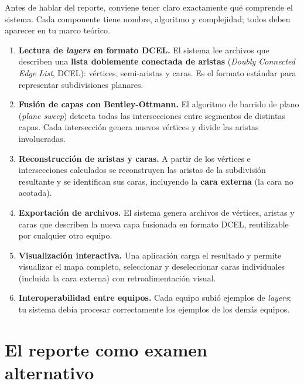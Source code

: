 \documentclass[12pt, oneside]{article}
\begin{document}
Antes de hablar del reporte, conviene tener claro exactamente qué
comprende el sistema.  Cada componente tiene nombre, algoritmo y
complejidad; todos deben aparecer en tu marco teórico.

\begin{enumerate}
  \item \textbf{Lectura de \textit{layers} en formato DCEL.}
        El sistema lee archivos que describen una \textbf{lista
        doblemente conectada de aristas} (\textit{Doubly Connected
        Edge List}, DCEL): vértices, semi-aristas y caras.  Es el
        formato estándar para representar subdivisiones planares.

  \item \textbf{Fusión de capas con Bentley-Ottmann.}
        El algoritmo de barrido de plano (\textit{plane sweep})
        detecta todas las intersecciones entre segmentos de distintas
        capas.  Cada intersección genera nuevos vértices y divide las
        aristas involucradas.

  \item \textbf{Reconstrucción de aristas y caras.}
        A partir de los vértices e intersecciones calculados se
        reconstruyen las aristas de la subdivisión resultante y se
        identifican sus caras, incluyendo la \textbf{cara externa}
        (la cara no acotada).

  \item \textbf{Exportación de archivos.}
        El sistema genera archivos de vértices, aristas y caras que
        describen la nueva capa fusionada en formato DCEL,
        reutilizable por cualquier otro equipo.

  \item \textbf{Visualización interactiva.}
        Una aplicación carga el resultado y permite visualizar el mapa
        completo, seleccionar y deseleccionar caras individuales
        (incluida la cara externa) con retroalimentación visual.

  \item \textbf{Interoperabilidad entre equipos.}
        Cada equipo subió ejemplos de \textit{layers}; tu sistema
        debía procesar correctamente los ejemplos de los demás equipos.
\end{enumerate}

\section{El reporte como examen alternativo}
\end{document}
